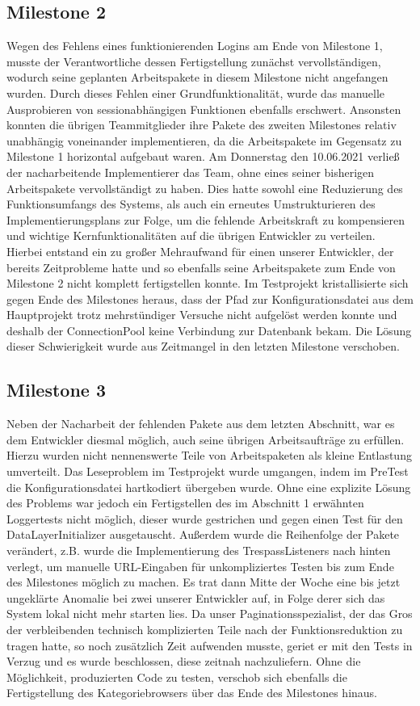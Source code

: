 \documentclass{article}
\begin{document}
\subsection{Milestone 2}
Wegen des Fehlens eines funktionierenden Logins am Ende von Milestone 1, musste der Verantwortliche dessen Fertigstellung zunächst vervollständigen, wodurch seine geplanten Arbeitspakete in diesem Milestone nicht angefangen wurden. Durch dieses Fehlen einer Grundfunktionalität, wurde das manuelle Ausprobieren von sessionabhängigen Funktionen ebenfalls erschwert. Ansonsten konnten die übrigen Teammitglieder ihre Pakete des zweiten Milestones relativ unabhängig voneinander implementieren, da die Arbeitspakete im Gegensatz zu Milestone 1 horizontal aufgebaut waren. Am Donnerstag den 10.06.2021 verließ der nacharbeitende Implementierer das Team, ohne eines seiner bisherigen Arbeitspakete vervollständigt zu haben. Dies hatte sowohl eine Reduzierung des Funktionsumfangs des Systems, als auch ein erneutes Umstrukturieren des Implementierungsplans zur Folge, um die fehlende Arbeitskraft zu kompensieren und wichtige Kernfunktionalitäten auf die übrigen Entwickler zu verteilen. Hierbei entstand ein zu großer Mehraufwand für einen unserer Entwickler, der bereits Zeitprobleme hatte und so ebenfalls seine Arbeitspakete zum Ende von Milestone 2 nicht komplett fertigstellen konnte. Im Testprojekt kristallisierte sich gegen Ende des Milestones heraus, dass der Pfad zur Konfigurationsdatei aus dem Hauptprojekt trotz mehrstündiger Versuche nicht aufgelöst werden konnte und deshalb der ConnectionPool keine Verbindung zur Datenbank bekam. Die Lösung dieser Schwierigkeit wurde aus Zeitmangel in den letzten Milestone verschoben.

\subsection{Milestone 3}
Neben der Nacharbeit der fehlenden Pakete aus dem letzten Abschnitt, war es dem Entwickler diesmal möglich, auch seine übrigen Arbeitsaufträge zu erfüllen. Hierzu wurden nicht nennenswerte Teile von Arbeitspaketen als kleine Entlastung umverteilt. Das Leseproblem im Testprojekt wurde umgangen, indem im PreTest die Konfigurationsdatei hartkodiert übergeben wurde. Ohne eine explizite Lösung des Problems war jedoch ein Fertigstellen des im Abschnitt 1 erwähnten Loggertests nicht möglich, dieser wurde gestrichen und gegen einen Test für den DataLayerInitializer ausgetauscht. Außerdem wurde die Reihenfolge der Pakete verändert, z.B. wurde die Implementierung des TrespassListeners nach hinten verlegt, um manuelle URL-Eingaben für unkompliziertes Testen bis zum Ende des Milestones möglich zu machen. Es trat dann Mitte der Woche eine bis jetzt ungeklärte Anomalie bei zwei unserer Entwickler auf, in Folge derer sich das System lokal nicht mehr starten lies. Da unser Paginationsspezialist, der das Gros der verbleibenden technisch komplizierten Teile nach der Funktionsreduktion zu tragen hatte, so noch zusätzlich Zeit aufwenden musste, geriet er mit den Tests in Verzug und es wurde beschlossen, diese zeitnah nachzuliefern. Ohne die Möglichkeit, produzierten Code zu testen, verschob sich ebenfalls die Fertigstellung des Kategoriebrowsers über das Ende des Milestones hinaus.
\end{document}
